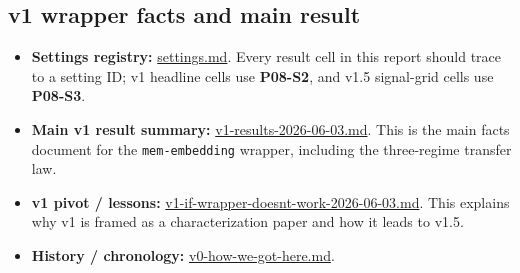 \documentclass[11pt]{article}
\newcommand{\code}[1]{\texttt{#1}}
\begin{document}
\subsection{v1 wrapper facts and main result}
\begin{itemize}
\item \textbf{Settings registry:}
\href{https://github.com/BDeMo/research-notes/blob/main/notes/plans/08-model-outputs-delta-w/settings.md}{settings.md}.
Every result cell in this report should trace to a setting ID; v1
headline cells use \textbf{P08-S2}, and v1.5 signal-grid cells use
\textbf{P08-S3}.
\item \textbf{Main v1 result summary:}
\href{https://github.com/BDeMo/research-notes/blob/main/notes/plans/08-model-outputs-delta-w/v1-results-2026-06-03.md}{v1-results-2026-06-03.md}.
This is the main facts document for the \code{mem-embedding} wrapper,
including the three-regime transfer law.
\item \textbf{v1 pivot / lessons:}
\href{https://github.com/BDeMo/research-notes/blob/main/notes/plans/08-model-outputs-delta-w/v1-if-wrapper-doesnt-work-2026-06-03.md}{v1-if-wrapper-doesnt-work-2026-06-03.md}.
This explains why v1 is framed as a characterization paper and how it
leads to v1.5.
\item \textbf{History / chronology:}
\href{https://github.com/BDeMo/research-notes/blob/main/notes/plans/08-model-outputs-delta-w/v0-how-we-got-here.md}{v0-how-we-got-here.md}.
\end{itemize}
\end{document}
